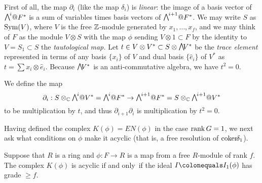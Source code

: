First of all, the map $\partial_{i}$ (like the map $\delta_{i}$) is
\emph{linear}: the image of a basis vector of $\mwedge^{i}@F^{*} $ is a
sum of variables times basis vectors
of $\mwedge^{i+1}@F^{*}$. We may write $S$ as $\operatorname{Sym}(V)$, where $V$ is the
free ${\mathbb Z}$-module generated by $x_{1}, \dots, x_{f}$, and we may think
of $F$ as the module $V\otimes S$ with the map
$\phi$ sending $V\otimes 1\subset F$ by the identity to $V = S_{1}\subset S$
\emdash the 
\emph{tautological map.}
%
Let $t\in V\otimes V^{*}\subset S\otimes \mwedge \,V^{*}$ be the \emph{trace element}
%
represented in terms of any basis $\{x_{i}\}$ of $V$
and dual basis $\{\hat e_{i}\}$ of $V^{*}$ as $t = \sum x_{i}\otimes
\hat e_{i}$. Because $\mwedge \,V^{*}$ is
an anti-commutative algebra, we have $t^{2} = 0$.

We define the map
$$
\partial_{i}: S\otimes_{\CC} \mwedge^{i}@V^{*} = \mwedge^{i}@F^{*}  \to
\mwedge^{i+1}@F^{*} = S\otimes_{\CC} \mwedge^{i+1}@V^{*}
$$
to be multiplication by $t$, and thus $\partial_{i+1}\partial_{i}$ is
multiplication by $t^{2} = 0$.

Having defined the complex $K(\phi) = EN(\phi)$ in the case $\operatorname{rank} G =
1$, we next ask what conditions on $\phi$
make it acyclic (that is, a free resolution of $\coker \delta_{1}$).

\begin{theorem}\label{rankG1}
Suppose that $R$ is a ring and $\phi: F\to R$ is a map from a free
$R$-module of rank $f$.
The complex $K(\phi)$ is acyclic if and only~if the ideal $I \colonequals
I_{1}(\phi)$ has grade $\geq f$.
%
\unif
\end{theorem}

